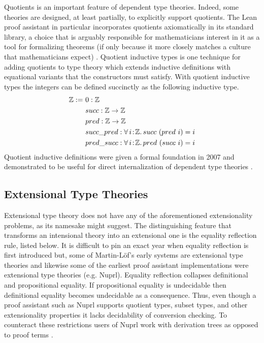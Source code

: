 Quotients is an important feature of dependent type theories.
Indeed, some theories are designed, at least partially, to explicitly support quotients.
The Lean proof assistant in particular incorporates quotients axiomatically in its standard library, a choice that is arguably responsible for mathematicians interest in it as a tool for formalizing theorems (if only because it more closely matches a culture that mathematicians expect) \cite{carneiro2019}.
Quotient inductive types is one technique for adding quotients to type theory which extends inductive definitions with equational variants that the constructors must satisfy.
With quotient inductive types the integers can be defined succinctly as the following inductive type.
\begin{align*}
    \mathbb{Z} :=\ &0 : \mathbb{Z} \\
        &succ : \mathbb{Z} \to \mathbb{Z} \\
        &pred : \mathbb{Z} \to \mathbb{Z} \\
        &succ\_pred : {\forall}\, i\! : \! \mathbb{Z}.\, succ\ (pred\ i) = i \\
        &pred\_succ : {\forall}\, i\! : \! \mathbb{Z}.\, pred\ (succ\ i) = i
\end{align*}
Quotient inductive definitions were given a formal foundation in 2007 and demonstrated to be useful for direct internalization of dependent type theories \cite{altenkirch2016_quotients, dijkstra2017}.

\subsection{Extensional Type Theories}

Extensional type theory does not have any of the aforementioned extensionality problems, as its namesake might suggest.
The distinguishing feature that transforms an intensional theory into an extensional one is the equality reflection rule, listed below.
It is difficult to pin an exact year when equality reflection is first introduced but, some of Martin-L\"{o}f's early systems are extensional type theories and likewise some of the earliest proof assistant implementations were extensional type theories (e.g. Nuprl).
Equality reflection collapses definitional and propositional equality.
If propositional equality is undecidable then definitional equality becomes undecidable as a consequence.
Thus, even though a proof assistant such as Nuprl supports quotient types, subset types, and other extensionality properties it lacks decidability of conversion checking.
To counteract these restrictions users of Nuprl work with derivation trees as opposed to proof terms \cite{constable1986}.

